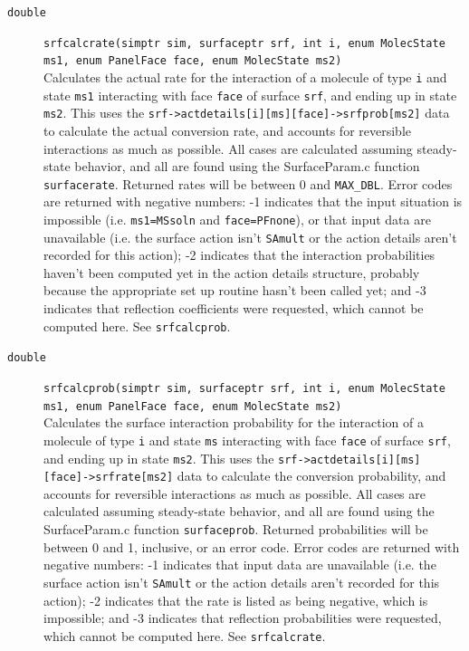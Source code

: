 \documentclass {scrbook}
\newcommand {\ttt} {\texttt}
\begin{document}
\begin{description}
\item[\ttt{double}]
\ttt{srfcalcrate(simptr sim, surfaceptr srf, int i, enum MolecState ms1, enum PanelFace face, enum MolecState ms2)}
\hfill \\
Calculates the actual rate for the interaction of a molecule of type \ttt{i} and state \ttt{ms1} interacting with face \ttt{face} of surface \ttt{srf}, and ending up in state \ttt{ms2}. This uses the \ttt{srf->actdetails[i][ms][face]->srfprob[ms2]} data to calculate the actual conversion rate, and accounts for reversible interactions as much as possible. All cases are calculated assuming steady-state behavior, and all are found using the SurfaceParam.c function \ttt{surfacerate}. Returned rates will be between 0 and \ttt{MAX\_DBL}. Error codes are returned with negative numbers: -1 indicates that the input situation is impossible (i.e. \ttt{ms1=MSsoln} and \ttt{face=PFnone}), or that input data are unavailable (i.e. the surface action isn't \ttt{SAmult} or the action details aren't recorded for this action); -2 indicates that the interaction probabilities haven't been computed yet in the action details structure, probably because the appropriate set up routine hasn't been called yet; and -3 indicates that reflection coefficients were requested, which cannot be computed here. See \ttt{srfcalcprob}.

\item[\ttt{double}]
\ttt{srfcalcprob(simptr sim, surfaceptr srf, int i, enum MolecState ms1, enum PanelFace face, enum MolecState ms2)}
\hfill \\
Calculates the surface interaction probability for the interaction of a molecule of type \ttt{i} and state \ttt{ms} interacting with face \ttt{face} of surface \ttt{srf}, and ending up in state \ttt{ms2}. This uses the \ttt{srf->actdetails[i][ms][face]->srfrate[ms2]} data to calculate the conversion probability, and accounts for reversible interactions as much as possible. All cases are calculated assuming steady-state behavior, and all are found using the SurfaceParam.c function \ttt{surfaceprob}. Returned probabilities will be between 0 and 1, inclusive, or an error code. Error codes are returned with negative numbers: -1 indicates that input data are unavailable (i.e. the surface action isn't \ttt{SAmult} or the action details aren't recorded for this action); -2 indicates that the rate is listed as being negative, which is impossible; and -3 indicates that reflection probabilities were requested, which cannot be computed here. See \ttt{srfcalcrate}.


\end{description}
\end{document}
